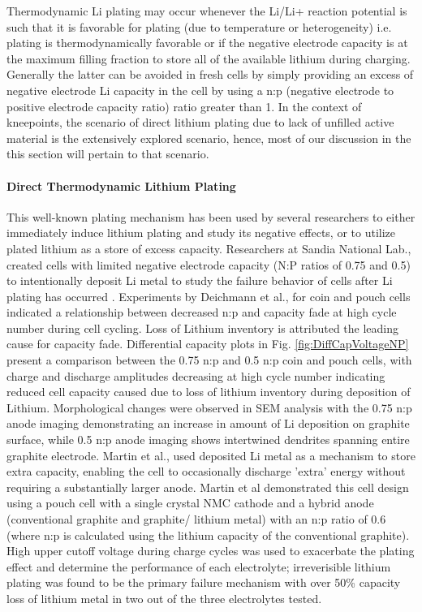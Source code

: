 \documentclass{article}
\newcommand{\pbox}[1]{{
\fbox{
\parbox{0.8\textwidth}{  \fbox{$\triangleright$\textcolor{blue}{\textbf{From Peter}:}} 
#1
}}}}
\begin{document}
Thermodynamic Li plating may occur whenever the Li/Li+ reaction potential is such that it is favorable for plating (due to temperature or heterogeneity) i.e. plating is thermodynamically favorable or if the negative electrode capacity is at the maximum filling fraction to store all of the available lithium during charging. Generally the latter can be avoided in fresh cells by simply providing an excess of negative electrode Li capacity in the cell by using a n:p (negative electrode to positive electrode capacity ratio) ratio greater than 1. In the context of kneepoints, the scenario of direct lithium plating due to lack of unfilled active material is the extensively explored scenario, hence, most of our discussion in the this section will pertain to that scenario.

\paragraph{Direct Thermodynamic Lithium Plating}

\pbox{READY FOR EDITING}

This well-known plating mechanism has been used by several researchers to either immediately induce lithium plating and study its negative effects, or to utilize plated lithium as a store of excess capacity. Researchers at Sandia National Lab., created cells with limited negative electrode capacity (N:P ratios of 0.75 and 0.5) to intentionally deposit Li metal to study the failure behavior of cells after Li plating has occurred \cite{deichmann_investigating_2020}. Experiments by Deichmann et al.,\cite{deichmann_investigating_2020} for coin and pouch cells indicated a relationship between decreased n:p and capacity fade at high cycle number during cell cycling. Loss of Lithium inventory is attributed the leading cause for capacity fade. Differential capacity plots in Fig. \ref{fig:DiffCapVoltageNP} present a comparison between the 0.75 n:p and 0.5 n:p coin and pouch cells, with charge and discharge amplitudes decreasing at high cycle number indicating reduced cell capacity caused due to loss of lithium inventory during deposition of Lithium. Morphological changes were observed in SEM analysis with the 0.75 n:p anode imaging demonstrating an increase in amount of Li deposition on graphite surface, while 0.5 n:p anode imaging shows intertwined dendrites spanning entire graphite electrode. Martin et al., \cite{martin_cycling_2020} used deposited Li metal as a mechanism to store extra capacity, enabling the cell to occasionally discharge 'extra' energy without requiring a substantially larger anode. Martin et al \cite{martin_cycling_2020} demonstrated this cell design using a pouch cell with a single crystal NMC cathode and a hybrid anode (conventional graphite and graphite/ lithium metal) with an n:p ratio of 0.6 (where n:p is calculated using the lithium capacity of the conventional graphite). High upper cutoff voltage during charge cycles was used to exacerbate the plating effect and determine the performance of each electrolyte; irreverisible lithium plating was found to be the primary failure mechanism with over 50\% capacity loss of lithium metal in two out of the three electrolytes tested.
\end{document}
